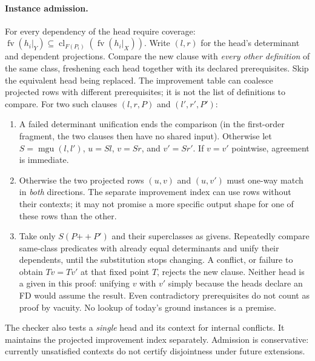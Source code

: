 \documentclass[11pt]{article}
\theoremstyle{definition}
\newcommand{\fv}{\operatorname{fv}}
\newcommand{\clo}{\operatorname{cl}}
\newcommand{\mgu}{\operatorname{mgu}}
\begin{document}
\paragraph{Instance admission.}
For every dependency of the head require coverage:
$\fv(h_i|_Y)\subseteq\clo_{F(P_i)}(\fv(h_i|_X))$. Write $(l,r)$ for
the head's determinant and dependent projections. Compare the new clause
with \emph{every other definition} of the same class, freshening each
head together with its declared prerequisites. Skip the equivalent head
being replaced. The improvement table can coalesce projected rows with
different prerequisites; it is not the list of definitions to compare.
For two such clauses $(l,r,P)$ and $(l',r',P')$:
\begin{enumerate}
\item A failed determinant unification ends the comparison (in the
      first-order fragment, the two clauses then have no shared input).
      Otherwise let $S=\mgu(l,l')$, $u=Sl$, $v=Sr$, and $v'=Sr'$.
      If $v=v'$ pointwise, agreement is immediate.
\item Otherwise the two projected rows $(u,v)$ and $(u,v')$ must
      one-way match in \emph{both} directions. The separate improvement
      index can use rows without their contexts; it may not promise a
      more specific output shape for one of these rows than the other.
\item Take only $S(P\mathbin{+\!\!+}P')$ and their superclasses as givens.
      Repeatedly compare same-class predicates with already equal
      determinants and unify their dependents, until the substitution stops
      changing. A conflict, or failure to obtain $Tv=Tv'$ at that fixed
      point $T$, rejects the new clause. Neither head is a given in this
      proof: unifying $v$ with $v'$ simply because the heads declare an
      FD would assume the result. Even contradictory prerequisites do not
      count as proof by vacuity. No lookup of today's ground instances is
      a premise.
\end{enumerate}
The checker also tests a \emph{single} head and its context for internal
conflicts. It maintains the projected improvement index separately.
Admission is conservative: currently unsatisfied contexts do not certify
disjointness under future extensions.
\end{document}
